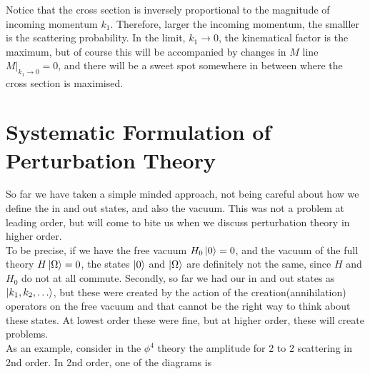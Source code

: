 \documentclass[11pt]{article}
\numberwithin{equation}{section}
\begin{document}
Notice that the cross section is inversely proportional to the magnitude of incoming momentum \(k_1\). Therefore, larger the incoming momentum, the smalller is the scattering probability. In the limit, \(k_1\to0\), the kinematical factor is the maximum, but of course this will be accompanied by changes in \(M\) line \(M|_{k_1\to 0} =  0\), and there will be a sweet spot somewhere in between where the cross section is maximised.

\newpage
\section{Systematic Formulation of Perturbation Theory}
So far we have taken a simple minded approach, not being careful about how we define the in and out states, and also the vacuum. This was not a problem at leading order, but will come to bite us when we discuss perturbation theory in higher order. \\

To be precise, if we have the free vacuum \(H_0\ket{0} = 0\), and the vacuum of the full theory \(H\ket{\Omega} = 0\), the states \(\ket{0}\) and \(\ket{\Omega}\) are definitely not the same, since \(H\) and \(H_0\) do not at all commute. Secondly, so far we had our in and out states as \(\ket{k_1, k_2, \ldots}\), but these were created by the action of the creation(annihilation) operators on the free vacuum and that cannot be the right way to think about these states. At lowest order these were fine, but at higher order, these will create problems. \\
As an example, consider in the \(\phi^4\) theory the amplitude for 2 to 2 scattering in 2nd order. In 2nd order, one of the diagrams is 
\begin{figure}[h]
    \centering
\end{figure}
\end{document}
